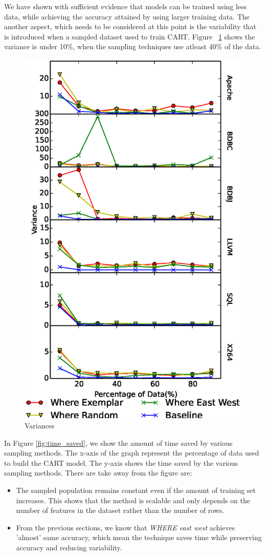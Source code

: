 \documentclass{sig-alternative}
\newcommand{\bi}{\begin{itemize}}%
\newcommand{\ei}{\end{itemize}}
\begin{document}
We have shown with sufficient evidence that models can be trained using less data, while achieving the accuracy
attained by using larger training data. 
The another aspect, which needs to be considered at this point is the variability that is introduced  when a sampled dataset used to train CART. 
Figure ~\ref{fig:Variance} shows the variance is under 10\%, when the sampling techniques use atleast 40\% of the data. 
\begin{figure}[!t]
\includegraphics[width=0.9\linewidth]{Figures/Variance.eps}
\caption{Variances }\label{fig:Variance}
\end{figure}

In Figure \ref{fig:time_saved}, we show the amount of time saved by various sampling methods. The x-axis of the graph represent the percentage of data used to build the CART model. The y-axis shows the time saved by the various sampling methods. There are take away from the figure are:
\bi
    \item{The sampled population remains constant even if the amount of training set increases. This shows that the method is scalable and only depends on the number of features in the dataset rather than the number of rows.}
    \item{From the previous sections, we know that \textit{WHERE east west} achieves 'almost' same accuracy,
    which mean the technique saves time while preserving accuracy and reducing variability.}
\ei
\end{document}
